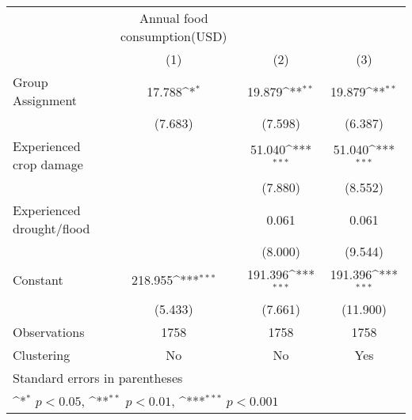 {
\def\sym#1{\ifmmode^{#1}\else\(^{#1}\)\fi}
\begin{tabular}{l*{3}{c}}
\hline\hline
                    &Annual food consumption(USD)                                     \\
                    &\multicolumn{1}{c}{(1)}         &\multicolumn{1}{c}{(2)}         &\multicolumn{1}{c}{(3)}         \\
\hline
Group Assignment    &      17.788\sym{*}  &      19.879\sym{**} &      19.879\sym{**} \\
                    &     (7.683)         &     (7.598)         &     (6.387)         \\
[1em]
Experienced crop damage&                     &      51.040\sym{***}&      51.040\sym{***}\\
                    &                     &     (7.880)         &     (8.552)         \\
[1em]
Experienced drought/flood&                     &       0.061         &       0.061         \\
                    &                     &     (8.000)         &     (9.544)         \\
[1em]
Constant            &     218.955\sym{***}&     191.396\sym{***}&     191.396\sym{***}\\
                    &     (5.433)         &     (7.661)         &    (11.900)         \\
\hline
Observations        &        1758         &        1758         &        1758         \\
Clustering          &          No         &          No         &         Yes         \\
\hline\hline
\multicolumn{4}{l}{\footnotesize Standard errors in parentheses}\\
\multicolumn{4}{l}{\footnotesize \sym{*} \(p<0.05\), \sym{**} \(p<0.01\), \sym{***} \(p<0.001\)}\\
\end{tabular}
}
